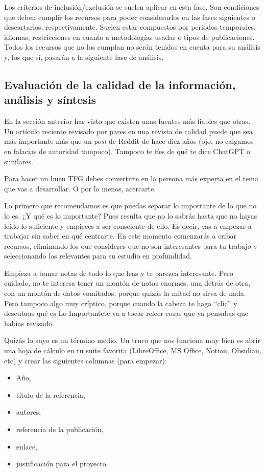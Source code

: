 Los criterios de inclusión/exclusión se suelen aplicar en esta fase. Son condiciones que deben cumplir los recursos para poder considerarlos en las fases siguientes o descartarlos, respectivamente. Suelen estar compuestos por periodos temporales, idiomas, restricciones en cuanto a metodologías usadas o tipos de publicaciones. Todos los recursos que no los cumplan no serán tenidos en cuenta para su análisis y, los que sí, pasarán a la siguiente fase de análisis.

\subsection{Evaluación de la calidad de la información, análisis y síntesis}

En la sección anterior has visto que existen unas fuentes más fiables que otras. Un artículo reciente revisado por pares en una revista de calidad puede que sea más importante más que un \textit{post} de Reddit de hace diez años (ojo, no caigamos en falacias de autoridad tampoco). Tampoco te fíes de qué te dice ChatGPT o similares.

Para hacer un buen TFG debes convertirte en la persona más experta en el tema que vas a desarrollar. O por lo menos, acercarte.

Lo primero que recomendamos es que puedas separar lo importante de lo que no lo es. ¿Y qué es lo importante?  Pues resulta que no lo sabrás hasta que no hayas leído lo suficiente y empieces a ser consciente de ello. Es decir, vas a empezar a trabajar sin saber en qué centrarte. En este momento comenzarás a cribar recursos, eliminando los que consideres que no son interesantes para tu trabajo y seleccionando los relevantes para su estudio en profundidad.

Empieza a tomar notas de todo lo que leas y te parezca interesante. Pero cuidado, no te interesa tener un montón de notas enormes, una detrás de otra, con un montón de datos vomitados, porque quizás la mitad no sirva de nada. Pero tampoco algo muy críptico, porque cuando la cabeza te haga ``clic'' y descubras qué es Lo Importante\texttrademark  te va a tocar releer cosas que ya pensabas que habías revisado. 

Quizás lo suyo es un término medio. Un truco que nos funciona muy bien es abrir una hoja de cálculo en tu suite favorita (LibreOffice, MS Office, Notion, Obsidian, etc) y crear las siguientes columnas (para empezar):
\begin{itemize}
    \item Año,
    \item título de la referencia,
    \item autores,
    \item referencia de la publicación,
    \item enlace,
    \item justificación para el proyecto.
\end{itemize}

